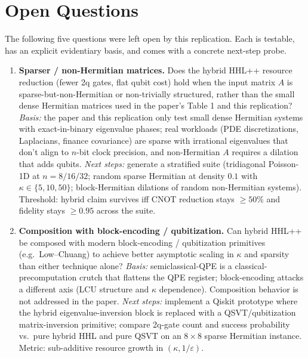 \section{Open Questions}

The following five questions were left open by this replication. Each
is testable, has an explicit evidentiary basis, and comes with a
concrete next-step probe.

\begin{enumerate}
\item \textbf{Sparser / non-Hermitian matrices.} Does the hybrid HHL++
  resource reduction (fewer 2q gates, flat qubit cost) hold when the
  input matrix $A$ is sparse-but-non-Hermitian or non-trivially
  structured, rather than the small dense Hermitian matrices used in
  the paper's Table 1 and this replication?
  \emph{Basis:} the paper and this replication only test small dense
  Hermitian systems with exact-in-binary eigenvalue phases; real
  workloads (PDE discretizations, Laplacians, finance covariance) are
  sparse with irrational eigenvalues that don't align to $n$-bit
  clock precision, and non-Hermitian $A$ requires a dilation that
  adds qubits.
  \emph{Next steps:} generate a stratified suite (tridiagonal Poisson-1D
  at $n=8/16/32$; random sparse Hermitian at density $0.1$ with
  $\kappa\in\{5,10,50\}$; block-Hermitian dilations of random non-Hermitian
  systems). Threshold: hybrid claim survives iff CNOT reduction stays
  $\geq 50\%$ and fidelity stays $\geq 0.95$ across the suite.

\item \textbf{Composition with block-encoding / qubitization.} Can
  hybrid HHL++ be composed with modern block-encoding / qubitization
  primitives (e.g.\ Low--Chuang) to achieve better asymptotic scaling
  in $\kappa$ and sparsity than either technique alone?
  \emph{Basis:} semiclassical-QPE is a classical-precomputation crutch
  that flattens the QPE register; block-encoding attacks a different
  axis (LCU structure and $\kappa$ dependence). Composition behavior
  is not addressed in the paper.
  \emph{Next steps:} implement a Qiskit prototype where the hybrid
  eigenvalue-inversion block is replaced with a QSVT/qubitization
  matrix-inversion primitive; compare 2q-gate count and success
  probability vs.\ pure hybrid HHL and pure QSVT on an $8\times 8$
  sparse Hermitian instance. Metric: sub-additive resource growth
  in $(\kappa, 1/\varepsilon)$.


\end{enumerate}
